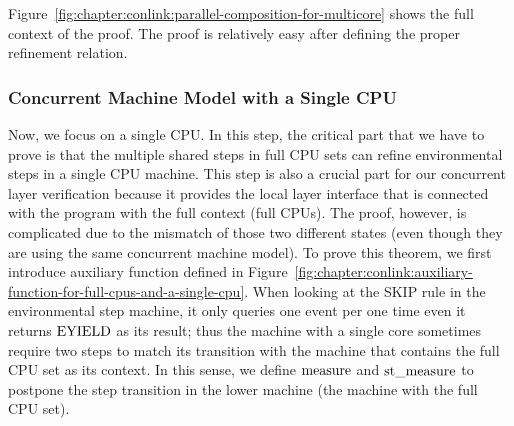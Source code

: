 Figure~\ref{fig:chapter:conlink:parallel-composition-for-multicore} shows the full context of the proof. 
The proof is relatively easy after defining the proper refinement relation. 

\subsubsection{Concurrent Machine Model with a Single CPU}


Now, we focus on a single CPU. 
In this step, 
the critical part that we have to prove is that the multiple shared steps in full CPU sets can
 refine environmental steps in a single CPU machine.
This step is also a crucial part for our concurrent layer verification because
it provides the local layer interface that is connected with the program with the full context (full CPUs).
The proof, however, is complicated due to the mismatch of those two different states (even though they are 
using the same concurrent machine model).
To prove this theorem, 
we first introduce auxiliary function defined in Figure~\ref{fig:chapter:conlink:auxiliary-function-for-full-cpus-and-a-single-cpu}. 
When looking at the \textsf{SKIP} rule in the environmental step machine, 
it only queries one event per one time even it returns ${\mathrm{EYIELD}}$ as its result;
thus the machine with a single core sometimes require two steps to match its transition with the machine that contains the full CPU set as its context. 
In this sense, we define ${\mathrm{measure}}$ and ${\mathrm{st}\_\mathrm{measure}}$ to postpone the step transition in the lower machine (the machine with the full CPU set). 

